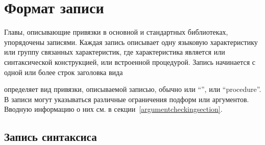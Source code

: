 \chapter{Формат записи}
\label{entryformatchapter}

Главы, описывающие привязки в основной и стандартных библиотеках,
упорядочены записями. Каждая запись описывает одну языковую характеристику или группу
связанных характеристик, где характеристика является или синтаксической конструкцией, или
встроенной процедурой. Запись начинается с одной или более строк заголовка вида


\noindent{}\unpenalty

 определяет вид привязки, описываемой записью, обычно или ``\exprtype'', или
``procedure''. В записи могут указываться различные ограничения подформ или аргументов. Вводную
информацию о них см. в секции~\ref{argumentcheckingsection}.\vspace{2mm}

\section{Запись синтаксиса}\vspace{2mm}

